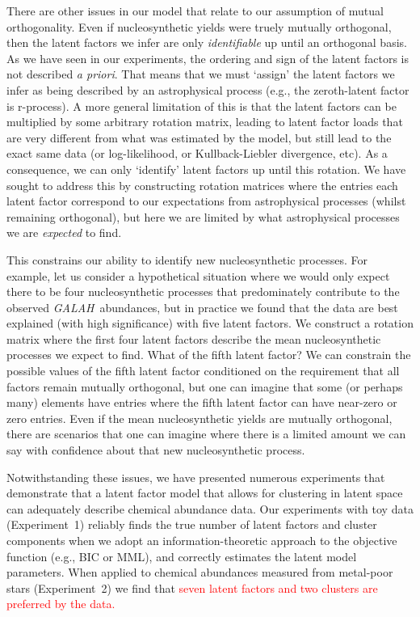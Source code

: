 \documentclass[twocolumn]{aastex62}
\newcommand{\project}[1]{\textsl{#1}}
\newcommand{\GALAH}{\project{GALAH}}
\newcommand{\todo}[1]{\textcolor{red}{#1}}
\begin{document}
There are other issues in our model that relate to our assumption of mutual
orthogonality. Even if nucleosynthetic yields were truely mutually orthogonal,
then the latent factors we infer are only \emph{identifiable} up until an
orthogonal basis. As we have seen in our experiments, the ordering and sign 
of the latent factors is not described \emph{a priori}. That means that we
must `assign' the latent factors we infer as being described by an astrophysical
process (e.g., the zeroth-latent factor is r-process). A more general limitation
of this is that the latent factors can be multiplied by some arbitrary rotation
matrix, leading to latent factor loads that are very different from what was
estimated by the model, but still lead to the exact same data (or log-likelihood,
or Kullback-Liebler divergence, etc). As a consequence, we can only `identify'
latent factors up until this rotation. We have sought to address this by constructing
rotation matrices where the entries each latent factor correspond to our expectations
from astrophysical processes (whilst remaining orthogonal), but here we are limited
by what astrophysical processes we are \emph{expected} to find.

This constrains our ability to identify new nucleosynthetic processes. For example,
let us consider a hypothetical situation where we would only expect there to be four 
nucleosynthetic processes that predominately contribute to the observed \GALAH\ abundances,
but in practice we found that the data are best explained (with high significance) with
five latent factors. We construct a rotation matrix where the first four latent factors
describe the mean nucleosynthetic processes we expect to find. What of the fifth latent
factor? We can constrain the possible values of the fifth latent factor conditioned on
the requirement that all factors remain mutually orthogonal, but one can imagine that
some (or perhaps many) elements have entries where the fifth latent factor can have
near-zero or zero entries. Even if the mean nucleosynthetic yields are mutually
orthogonal, there are scenarios that one can imagine where there is a limited amount
we can say with confidence about that new nucleosynthetic process.

Notwithstanding these issues, we have presented numerous experiments that demonstrate
that a latent factor model that allows for clustering in latent space can adequately
describe chemical abundance data. Our experiments with toy data (Experiment~1) reliably
finds the true number of latent factors and cluster components when we adopt an information-theoretic approach to the objective function (e.g., BIC or MML), and correctly estimates the latent
model parameters. When applied to chemical abundances measured from metal-poor stars 
(Experiment~2) we find that \todo{seven latent factors and two clusters are preferred by
the data.}
\end{document}
